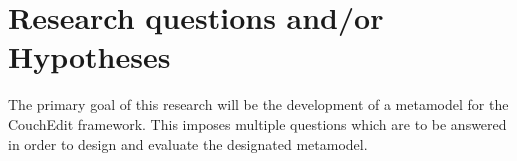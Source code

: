 \documentclass[10pt,a4paper,oneside]{scrartcl}
\newcommand\hint[2]{
\ifthenelse{\boolean{showhints}}{
\begin{center}
\colorbox{black!10}{
\begin{minipage}{.963\textwidth}
#2\hfill\textbf{#1}
\end{minipage}
}\end{center}}{}
}
\begin{document}
\section{Research questions and/or Hypotheses}
\label{sub:questions}






The primary goal of this research will be the development of a metamodel for the CouchEdit framework. This imposes multiple questions which are to be answered in order to design and evaluate the designated metamodel.
\end{document}
